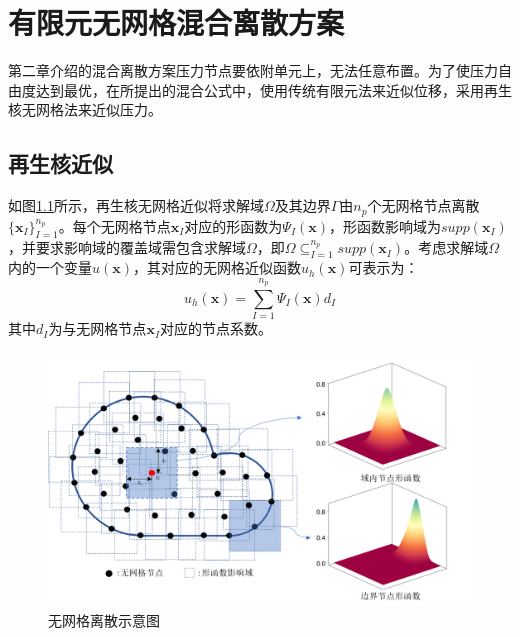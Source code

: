 \chapter{有限元无网格混合离散方案}

第二章介绍的混合离散方案压力节点要依附单元上，无法任意布置。为了使压力自由度达到最优，在所提出的混合公式中，使用传统有限元法来近似位移，采用再生核无网格法来近似压力。
\section{再生核近似}
如图\ref{ch_4:fig:meshfree}所示，再生核无网格近似将求解域$\Omega$及其边界$\Gamma$由$n_p$个无网格节点离散$\{\boldsymbol x_I\}_{I=1}^{n_p}$。每个无网格节点$\boldsymbol x_I$对应的形函数为$\Psi_I(\boldsymbol{x})$，形函数影响域为$supp(\boldsymbol{x}_I)$，并要求影响域的覆盖域需包含求解域$\Omega$，即$\Omega\subseteq^{n_p}_{I=1}supp(\boldsymbol{x}_I)$。考虑求解域$\Omega$内的一个变量$u(\boldsymbol{x})$，其对应的无网格近似函数$u_h(\boldsymbol{x})$可表示为：
\begin{equation}
    u_h(\boldsymbol x) = \sum_{I=1}^{n_p} \Psi_I(\boldsymbol x) d_I
\end{equation}
其中$d_I$为与无网格节点$\boldsymbol{x}_I$对应的节点系数。
\begin{figure}[H]
    \centering 
        \includegraphics[scale=0.7]{figures/meshfree.png}
        \caption{无网格离散示意图}\label{ch_4:fig:meshfree}
\end{figure}

